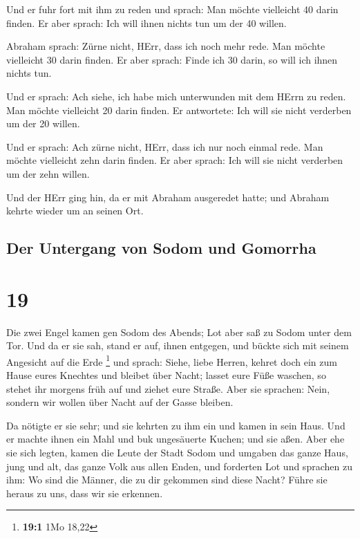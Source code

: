  Und er fuhr fort mit ihm zu reden und sprach: Man möchte
vielleicht 40 darin finden. Er aber sprach: Ich will ihnen nichts tun um
der 40 willen.

 Abraham sprach: Zürne nicht, HErr, dass ich noch mehr
rede. Man möchte vielleicht 30 darin finden. Er aber sprach: Finde ich
30 darin, so will ich ihnen nichts tun.

 Und er sprach: Ach siehe, ich habe mich unterwunden mit
dem HErrn zu reden. Man möchte vielleicht 20 darin finden. Er
antwortete: Ich will sie nicht verderben um der 20 willen.

 Und er sprach: Ach zürne nicht, HErr, dass ich nur noch
einmal rede. Man möchte vielleicht zehn darin finden. Er aber sprach:
Ich will sie nicht verderben um der zehn willen.

 Und der HErr ging hin, da er mit Abraham ausgeredet
hatte; und Abraham kehrte wieder um an seinen Ort.

\hypertarget{der-untergang-von-sodom-und-gomorrha}{%
\subsection{Der Untergang von Sodom und
Gomorrha}\label{der-untergang-von-sodom-und-gomorrha}}

\hypertarget{section-18}{%
\section{19}\label{section-18}}

 Die zwei Engel kamen gen Sodom des Abends; Lot aber saß
zu Sodom unter dem Tor. Und da er sie sah, stand er auf, ihnen entgegen,
und bückte sich mit seinem Angesicht auf die Erde \footnote{\textbf{19:1}
  1Mo 18,22}  und sprach: Siehe, liebe Herren, kehret doch
ein zum Hause eures Knechtes und bleibet über Nacht; lasset eure Füße
waschen, so stehet ihr morgens früh auf und ziehet eure Straße. Aber sie
sprachen: Nein, sondern wir wollen über Nacht auf der Gasse bleiben.

 Da nötigte er sie sehr; und sie kehrten zu ihm ein und
kamen in sein Haus. Und er machte ihnen ein Mahl und buk ungesäuerte
Kuchen; und sie aßen.  Aber ehe sie sich legten, kamen die
Leute der Stadt Sodom und umgaben das ganze Haus, jung und alt, das
ganze Volk aus allen Enden,  und forderten Lot und
sprachen zu ihm: Wo sind die Männer, die zu dir gekommen sind diese
Nacht? Führe sie heraus zu uns, dass wir sie erkennen.

